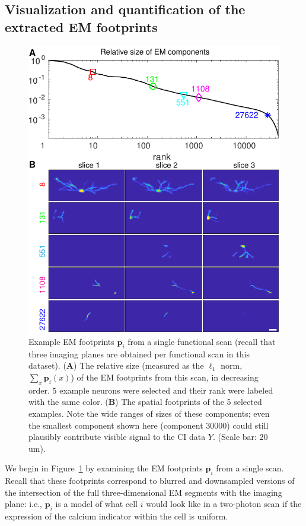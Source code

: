 \documentclass[10pt,letterpaper]{article}
\begin{document}
{\subsection{Visualization and quantification of the extracted EM footprints}
\begin{figure}[t!]
	\centering
	\includegraphics[width=1\textwidth]{Figs/fig_example_pi.pdf}
	\caption{Example EM footprints $\bm{p}_i$ from a single functional scan (recall that three imaging planes are obtained per functional scan in this dataset).   (\textbf{A}) The relative size (measured as the $\ell_1$ norm, $\sum_x \bm{p}_i(x)$) of the EM footprints from this scan, in decreasing order. $5$ example neurons were selected and their rank were labeled with the same color. (\textbf{B}) The spatial footprints of the 5 selected examples.  Note the wide ranges of sizes of these components; even the smallest component shown here (component 30000) could still plausibly contribute visible signal to the CI data $Y$. (Scale bar: 20 um).}
	\label{fig:em}
\end{figure}

We begin in Figure~\ref{fig:em} by examining the EM footprints $\bm{p}_i$ from a single scan.  Recall that these footprints correspond to blurred and downsampled versions of the intersection of the full three-dimensional EM segments with the imaging plane: i.e., $\bm{p}_i$ is a model of what cell $i$ would look like in a two-photon scan if the expression of the calcium indicator within the cell is uniform.

}
\end{document}
